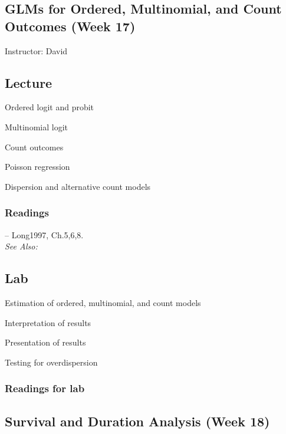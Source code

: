 \documentclass[11pt,a4paper]{article}
\newcommand{\textbook}[2][]{\noindent -- {#2}, {#1}.\vspace{.25em}\\}
\newcommand{\david}{\vspace{1em}\noindent Instructor: David\vspace{1em}\\}
\newcommand{\seealso}{\noindent \emph{See Also:}\\}
\begin{document}
\clearpage
\subsection{GLMs for Ordered, Multinomial, and Count Outcomes (Week 17)}
\emph{}

\david

\subsection*{Lecture}
\begin{itemize*}
\item Ordered logit and probit
\item Multinomial logit
\item Count outcomes
    \begin{itemize*}
    \item Poisson regression
    \item Dispersion and alternative count models
    \end{itemize*}
\end{itemize*}

\subsubsection*{Readings}
\textbook[Ch.5,6,8]{Long1997}

\seealso


\subsection*{Lab}

\begin{itemize*}
\item Estimation of ordered, multinomial, and count models
\item Interpretation of results
\item Presentation of results
\item Testing for overdispersion
\end{itemize*}

\subsubsection*{Readings for lab}



\clearpage
\subsection{Survival and Duration Analysis (Week 18)}
\emph{}
\end{document}
